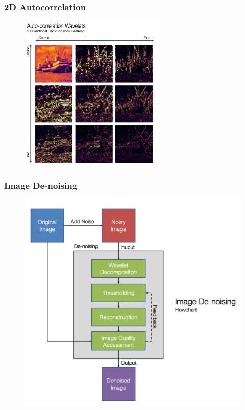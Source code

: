 \documentclass[aspectratio=169]{beamer}
\begin{document}
\begin{frame}
\frametitle{2D Autocorrelation}
    \begin{figure}
        \centering
        \includegraphics[height=7.5cm, keepaspectratio]{decomp_heatmap.png}
    \end{figure}
\end{frame}

\begin{frame}
\frametitle{Image De-noising}
    \begin{figure}
        \centering
        \includegraphics[height=0.8\textheight, keepaspectratio]{image_denoising.png}
    \end{figure}
\end{frame}
\end{document}
